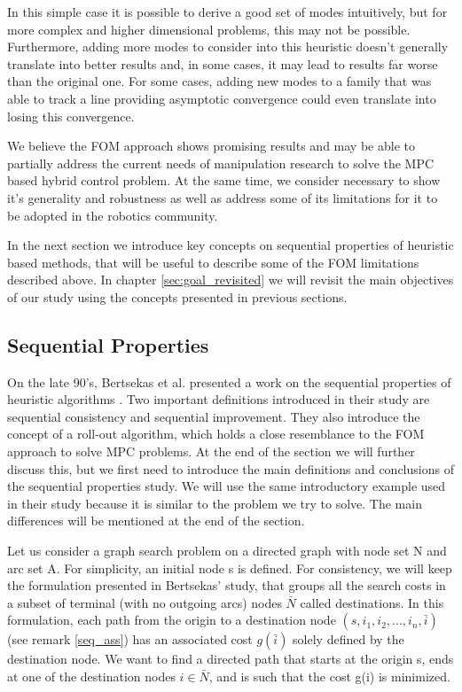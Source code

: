 \documentclass[12,twoside]{TFG-GM}
\theoremstyle{definition}
\theoremstyle{remark}
\newcommand*\mean[1]{\bar{#1}}
\newcommand*\diff[1]{\bar{#1}}
\begin{document}
In this simple case it is possible to derive a good set of modes intuitively, but for more complex and higher dimensional problems, this may not be possible. Furthermore, adding more modes to consider into this heuristic doesn't generally translate into better results and, in some cases, it may lead to results far worse than the original one. For some cases, adding new modes to a family that was able to track a line providing asymptotic convergence could even translate into losing this convergence.

We believe the FOM approach shows promising results and may be able to partially address the current needs of manipulation research to solve the MPC based hybrid control problem. At the same time, we consider necessary to show it's generality and robustness as well as address some of its limitations for it to be adopted in the robotics community.

In the next section we introduce key concepts on sequential properties of heuristic based methods, that will be useful to describe some of the FOM limitations described above. In chapter \ref{sec:goal_revisited} we will revisit the main objectives of our study using the concepts presented in previous sections.

\subsection{Sequential Properties}
\label{subsec:sequential}
On the late 90's, Bertsekas et al. presented a work on the sequential properties of heuristic algorithms \cite{seq}. Two important definitions introduced in their study are sequential consistency and sequential improvement. They also introduce the concept of a roll-out algorithm, which holds a close resemblance to the FOM approach to solve MPC problems. At the end of the section we will further discuss this, but we first need to introduce the main definitions and conclusions of the sequential properties study. We will use the same introductory example used in their study because it is similar to the problem we try to solve. The main differences will be mentioned at the end of the section.

Let us consider a graph search problem on a directed graph with node set N and arc set A. For simplicity, an initial node s is defined. For consistency, we will keep the formulation presented in Bertsekas' study, that groups all the search costs in a subset of terminal (with no outgoing arcs) nodes $\mean{N}$ called destinations. In this formulation, each path from the origin to a destination node $(s, i_1, i_2,..., i_n, \diff{i})$ (see remark \ref{seq_ass}) has an associated cost $g(\diff{i})$ solely defined by the destination node.  We want to find a directed path that starts at the origin s, ends at one of the destination nodes $i \in \mean{N}$, and is such that the cost g(i) is minimized.
\end{document}
